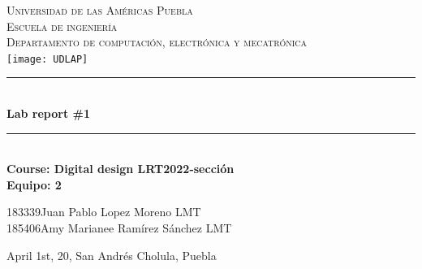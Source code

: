 \documentclass[12pt]{article}  %
\def\titulo{Lab report \#1}%
\def\materia{Course: Digital design LRT2022-sección} %
\def\fecha{April 1st, 20} %
\def\equipo {2}%
\def\ida{183339} %
\def\esta{Juan Pablo Lopez Moreno}
\def\lica{LMT}%
\def\idb{185406}
\def\estb{Amy Marianee Ramírez Sánchez}
\def\licb{LMT}%
\begin{document}
\begin{center}														
\newcommand{\HRule}{\rule{\linewidth}{0.5mm}}						
\thispagestyle{empty} 												
\vspace*{-1.5cm}								
\textsc{\huge Universidad de las Américas Puebla}\\[1.5cm]	
\textsc{\LARGE Escuela de ingeniería}\\[1.5cm]	
\textsc{\LARGE Departamento de computación, electrónica y mecatrónica}\\[1.5cm]												
\texttt{[image: UDLAP]}  									\vspace*{1cm}														\HRule \\[0.4cm]												
{ \huge \bfseries \titulo}\\[0.4cm]	
\HRule \\[1cm]														
{ \Large \bfseries \materia}\\[1cm] 	
{ \Large \bfseries Equipo: \equipo}\\[1cm] 							
\begin{flushleft} \Large											
\ida \hspace{0.5cm}\esta \hspace{0.5cm} \lica\\
\idb \hspace{0.5cm}\estb \hspace{0.5cm} \licb\\
\end{flushleft}														
\vfill																
\begin{center}													
{\Large  \fecha, San Andrés Cholula, Puebla}						
\end{center}												 		
\end{center}							 								\newpage						
\setcounter{page}{1} %
\end{document}
